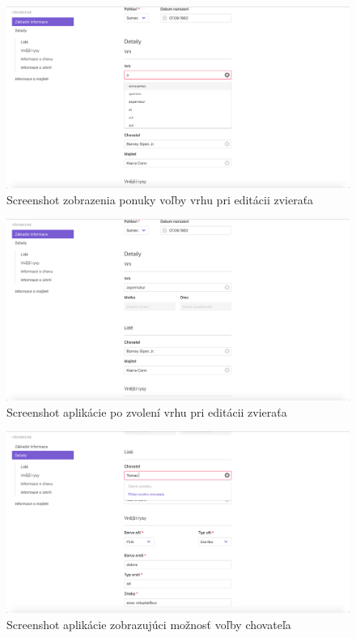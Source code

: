 \vspace*{\fill}

\begin{figure}[H]
	\includegraphics[width=1.0\textwidth]{media/priloha/zviera/editacia/2.png}
	\caption{Screenshot zobrazenia ponuky voľby vrhu pri editácii zvieraťa}
\end{figure}

\begin{figure}[H]
	\includegraphics[width=1.0\textwidth]{media/priloha/zviera/editacia/3.png}
	\caption{Screenshot aplikácie po zvolení vrhu pri editácii zvieraťa}
\end{figure}

\vspace*{\fill}

\begin{figure}[H]
	\includegraphics[width=1.0\textwidth]{media/priloha/zviera/editacia/4.png}
	\caption{Screenshot aplikácie zobrazujúci možnosť voľby chovateľa}
\end{figure}

